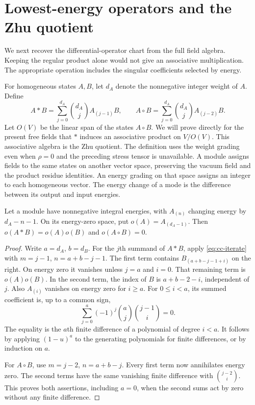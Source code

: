 \section{Lowest-energy operators and the Zhu quotient}

We next recover the differential-operator chart from the full field algebra.
Keeping the regular product alone would not give an associative multiplication.
The appropriate operation includes the singular coefficients selected by energy.

For homogeneous states $A,B$, let $d_A$ denote the nonnegative integer weight of $A$.
Define
\[
 A*B=\sum_{j=0}^{d_A}\binom{d_A}{j}A_{(j-1)}B,\qquad
 A\circ B=\sum_{j=0}^{d_A}\binom{d_A}{j}A_{(j-2)}B.
\]
Let $O(V)$ be the linear span of the states $A\circ B$.
We will prove directly for the present free fields that $*$ induces an associative product on $V/O(V)$.
This associative algebra is the Zhu quotient.
The definition uses the weight grading even when $\rho=0$ and the preceding stress tensor is unavailable.
A module assigns fields to the same states on another vector space, preserving the vacuum field and the product residue identities.
An energy grading on that space assigns an integer to each homogeneous vector.
The energy change of a mode is the difference between its output and input energies.

\begin{lemma}\label{lem:cc-zero-mode}
Let a module have nonnegative integral energies, with $A_{(n)}$ changing energy by $d_A-n-1$.
On its energy-zero space, put $o(A)=A_{(d_A-1)}$.
Then $o(A*B)=o(A)o(B)$ and $o(A\circ B)=0$.
\end{lemma}
\begin{proof}
Write $a=d_A$, $b=d_B$.
For the $j$th summand of $A*B$, apply \eqref{eq:cc-iterate} with
$m=j-1$, $n=a+b-j-1$.
The first term contains $B_{(a+b-j-1+i)}$ on the right.
On energy zero it vanishes unless $j=a$ and $i=0$.
That remaining term is $o(A)o(B)$.
In the second term, the index of $B$ is $a+b-2-i$, independent of $j$.
Also $A_{(i)}$ vanishes on energy zero for $i\geq a$.
For $0\leq i<a$, its summed coefficient is, up to a common sign,
\[
 \sum_{j=0}^a(-1)^j\binom aj\binom{j-1}{i}=0.
\]
The equality is the $a$th finite difference of a polynomial of degree $i<a$.
It follows by applying $(1-u)^a$ to the generating polynomials for finite differences, or by induction on $a$.

For $A\circ B$, use $m=j-2$, $n=a+b-j$.
Every first term now annihilates energy zero.
The second terms have the same vanishing finite difference with $\binom{j-2}{i}$.
This proves both assertions, including $a=0$, when the second sums act by zero without any finite difference.
\end{proof}


